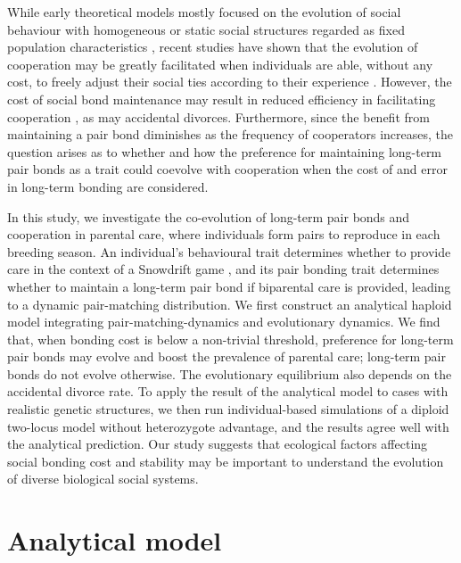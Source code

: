 \documentclass[12pt]{article}
\begin{document}
While early theoretical models mostly focused on the evolution of social behaviour with homogeneous or static social structures regarded as fixed population characteristics \citep[e.g.,][]{Axelrod.Hamilton1981, MaynardSmith1982}, recent studies have shown that the evolution of cooperation may be greatly facilitated when individuals are able, without any cost, to freely adjust their social ties according to their experience \citep{Skyrms.Pemantle2000, Santos.etal2006a, Pacheco.etal2008, Wu.etal2010}. However, the cost of social bond maintenance may result in reduced efficiency in facilitating cooperation \citep{Masuda2007}, as may accidental divorces. Furthermore, since the benefit from maintaining a pair bond diminishes as the frequency of cooperators increases, the question arises as to whether and how the preference for maintaining long-term pair bonds as a trait could coevolve with cooperation when the cost of and error in long-term bonding are considered.

In this study, we investigate the co-evolution of long-term pair bonds and cooperation in parental care, where individuals form pairs to reproduce in each breeding season. An individual's behavioural trait determines whether to provide care in the context of a Snowdrift game \citep{Hauert.Doebeli2004}, and its pair bonding trait determines whether to maintain a long-term pair bond if biparental care is provided, leading to a dynamic pair-matching distribution. We first construct an analytical haploid model integrating pair-matching-dynamics and evolutionary dynamics. We find that, when bonding cost is below a non-trivial threshold, preference for long-term pair bonds may evolve and boost the prevalence of parental care; long-term pair bonds do not evolve otherwise. The evolutionary equilibrium also depends on the accidental divorce rate. To apply the result of the analytical model to cases with realistic genetic structures, we then run individual-based simulations of a diploid two-locus model without heterozygote advantage, and the results agree well with the analytical prediction. Our study suggests that ecological factors affecting social bonding cost and stability may be important to understand the evolution of diverse biological social systems.


\section*{Analytical model}
\label{sec:model}
\end{document}
